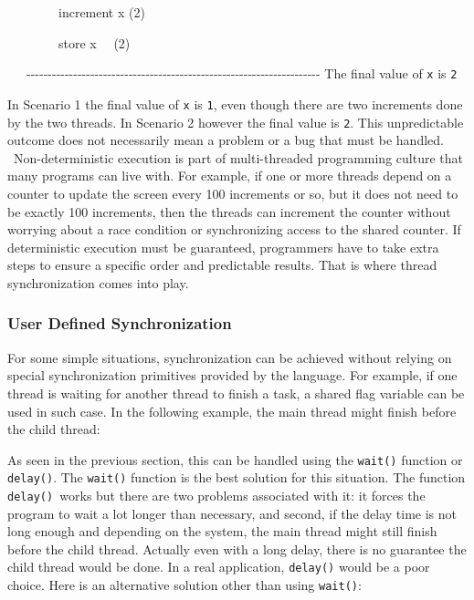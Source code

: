 \ \ \ \ \ \ \ \ increment x (2)

\ \ \ \ \ \ \ \ store x \ \ (2)

\ \ \ {}-{}-{}-{}-{}-{}-{}-{}-{}-{}-{}-{}-{}-{}-{}-{}-{}-{}-{}-{}-{}-{}-{}-{}-{}-{}-{}-{}-{}-{}-{}-{}-{}-{}-{}-{}-{}-{}-{}-{}-{}-{}-{}-{}-{}-{}-{}-{}-{}-{}-{}-{}-{}-{}-{}-{}-{}-{}-{}-{}-{}-{}-{}-{}-{}-{}-{}-{}-{}-
The final value of \texttt{x} is \texttt{2}


\bigskip

In Scenario 1 the final value of \texttt{x} is
\texttt{1}, even though there are two increments done by the
two threads. In Scenario 2 however the final value is
\texttt{2}. This unpredictable outcome does not necessarily
mean a problem or a bug that must be handled. \ Non-deterministic
execution is part of multi-threaded programming culture that many
programs can live with. For example, if one or more threads depend on a
counter to update the screen every 100 increments or so, but it does
not need to be exactly 100 increments, then the threads can increment
the counter without worrying about a race condition or synchronizing
access to the shared counter. If deterministic execution must be
guaranteed, programmers have to take extra steps to ensure a specific
order and predictable results. That is where thread synchronization
comes into play.

\subsubsection[User Defined Synchronization]{User Defined
Synchronization}

For some simple situations, synchronization can be achieved without
relying on special synchronization primitives provided by the language.
For example, if one thread is waiting for another thread to finish a
task, a shared flag variable can be used in such case. In the following
example, the main thread might finish before the child thread:


As seen in the previous section, this can be handled using the
\texttt{wait()} function or \texttt{delay()}. The
\texttt{wait()} function is the best solution for this
situation. The function \texttt{delay() }works but there are
two problems associated with it: it forces the program to wait a lot
longer than necessary, and second, if the delay time is not long enough
and depending on the system, the main thread might still finish before
the child thread. Actually even with a long delay, there is no
guarantee the child thread would be done. In a real application,
\texttt{delay()} would be a poor choice. Here is an
alternative solution other than using \texttt{wait()}:

